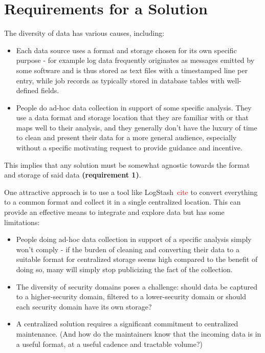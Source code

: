 \section{Requirements for a Solution}
\label{s:requirements}


The diversity of data has various causes, including:

\begin{itemize}
\item Each data source uses a format and storage chosen for its own 
      specific purpose - for example log data frequently originates
      as messages emitted by some software and is thus stored as
      text files with a timestamped line per entry, while job records
      as typically stored in database tables with well-defined fields.
\item People do ad-hoc data collection in support of some specific 
      analysis. They use a data format and storage location that 
      they are familiar with or that maps well to their 
      analysis, and they generally don't have the luxury of time to 
      clean and present their data for a more general audience,
      especially without a specific motivating request to provide 
      guidance and incentive.
\end{itemize}

This implies that any solution must be somewhat 
agnostic towards the format and storage of said data \textbf{(requirement 1)}.

One attractive approach is to use a tool like LogStash~\textcolor{red}{cite} 
to convert everything to a common format and collect it in a single 
centralized location. This can provide an effective means to integrate
and explore data but has some limitations:

\begin{itemize}
\item People doing ad-hoc data collection in support of a specific 
      analysis simply won't comply - if the burden of cleaning and 
      converting their data to a suitable format for centralized 
      storage seems high compared to the benefit of doing so, many
      will simply stop publicizing the fact of the collection.
\item The diversity of security domains poses a challenge: should data
      be captured to a higher-security domain, filtered to a lower-security
      domain or should each security domain have its own storage?
\item A centralized solution requires a significant commitment to
      centralized maintenance. (And how do the maintainers know that the 
      incoming data is in a useful format, at a useful cadence and
      tractable volume?)
\end{itemize}


